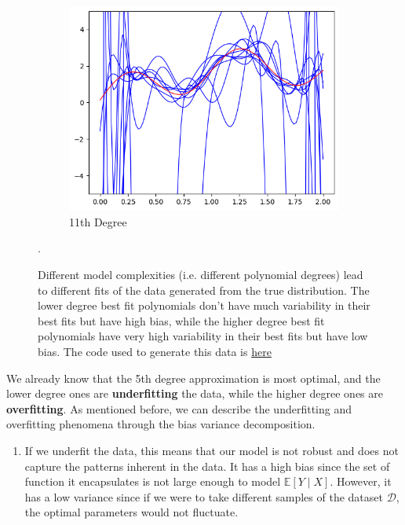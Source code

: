 \documentclass{article}
\begin{document}
\begin{example}
\begin{figure}[H]
\begin{subfigure}[b]{0.32\textwidth}
          \includegraphics[width=\textwidth]{img/poly_11_fit.png}
          \caption{11th Degree}
          \label{fig:11e}
        \end{subfigure}

        \caption{Different model complexities (i.e. different polynomial degrees) lead to different fits of the data generated from the true distribution. The lower degree best fit polynomials don't have much variability in their best fits but have high bias, while the higher degree best fit polynomials have very high variability in their best fits but have low bias. The code used to generate this data is \href{code/polynomial_fitting.py}{here}}.
        \label{fig:polynomial_fitting}
      \end{figure}

      We already know that the 5th degree approximation is most optimal, and the lower degree ones are \textbf{underfitting} the data, while the higher degree ones are \textbf{overfitting}. As mentioned before, we can describe the underfitting and overfitting phenomena through the bias variance decomposition. 

      \begin{enumerate}
        \item If we underfit the data, this means that our model is not robust and does not capture the patterns inherent in the data. It has a high bias since the set of function it encapsulates is not large enough to model $\mathbb{E}[Y\mid X]$. However, it has a low variance since if we were to take different samples of the dataset $\mathcal{D}$, the optimal parameters would not fluctuate. 


\end{enumerate}
\end{example}
\end{document}
